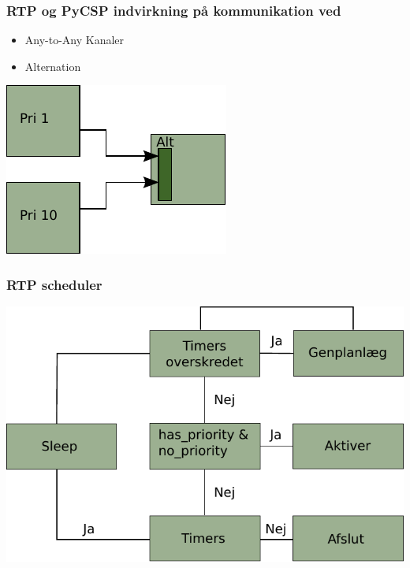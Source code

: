 \documentclass[12pt]{beamer}
\begin{document}
\begin{frame}
	\frametitle{RTP og PyCSP indvirkning på kommunikation ved}
	\begin{itemize}
		\item Any-to-Any Kanaler 
	 	\item Alternation
	\end{itemize} 
\begin{center}
	\includegraphics[scale=0.7]{alt-inheritance.pdf} 
\end{center}
\end{frame} 


\begin{frame}
  \frametitle{RTP scheduler}
\includegraphics[scale=0.9]{rtp-scheduler}
\end{frame}
\end{document}
